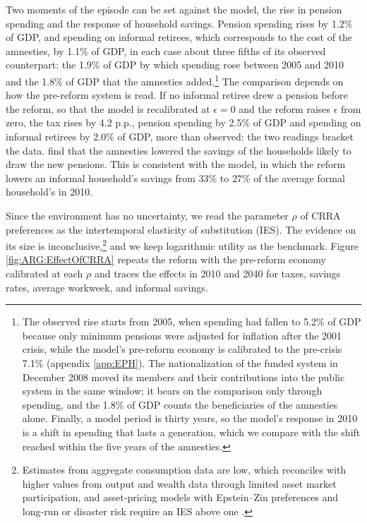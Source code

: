 Two moments of the episode can be set against the model, the rise in pension spending and the response of household savings. Pension spending rises by 1.2\% of GDP, and spending on informal retirees, which corresponds to the cost of the amnesties, by 1.1\% of GDP, in each case about three fifths of its observed counterpart: the 1.9\% of GDP by which spending rose between 2005 and 2010 and the 1.8\% of GDP that the amnesties added.\footnote{The observed rise starts from 2005, when spending had fallen to 5.2\% of GDP because only minimum pensions were adjusted for inflation after the 2001 crisis, while the model's pre-reform economy is calibrated to the pre-crisis 7.1\% (appendix \ref{app:EPH}). The nationalization of the funded system in December 2008 moved its members and their contributions into the public system in the same window; it bears on the comparison only through spending, and the 1.8\% of GDP counts the beneficiaries of the amnesties alone. Finally, a model period is thirty years, so the model's response in 2010 is a shift in spending that lasts a generation, which we compare with the shift reached within the five years of the amnesties.} The comparison depends on how the pre-reform system is read. If no informal retiree drew a pension before the reform, so that the model is recalibrated at $\epsilon = 0$ and the reform raises $\epsilon$ from zero, the tax rises by 4.2 p.p., pension spending by 2.5\% of GDP and spending on informal retirees by 2.0\% of GDP, more than observed: the two readings bracket the data. \textcite{Ruffo} find that the amnesties lowered the savings of the households likely to draw the new pensions. This is consistent with the model, in which the reform lowers an informal household's savings from 33\% to 27\% of the average formal household's in 2010.

Since the environment has no uncertainty, we read the parameter $\rho$ of CRRA preferences as the intertemporal elasticity of substitution (IES). The evidence on its size is inconclusive,\footnote{Estimates from aggregate consumption data are low, which \textcite{Guvenena1} reconciles with higher values from output and wealth data through limited asset market participation, and asset-pricing models with Epstein--Zin preferences and long-run or disaster risk require an IES above one \parencite{BansalYa1,Barroa1}.} and we keep logarithmic utility as the benchmark. Figure \ref{fig:ARG:EffectOfCRRA} repeats the reform with the pre-reform economy calibrated at each $\rho$ and traces the effects in 2010 and 2040 for taxes, savings rates, average workweek, and informal savings. 

